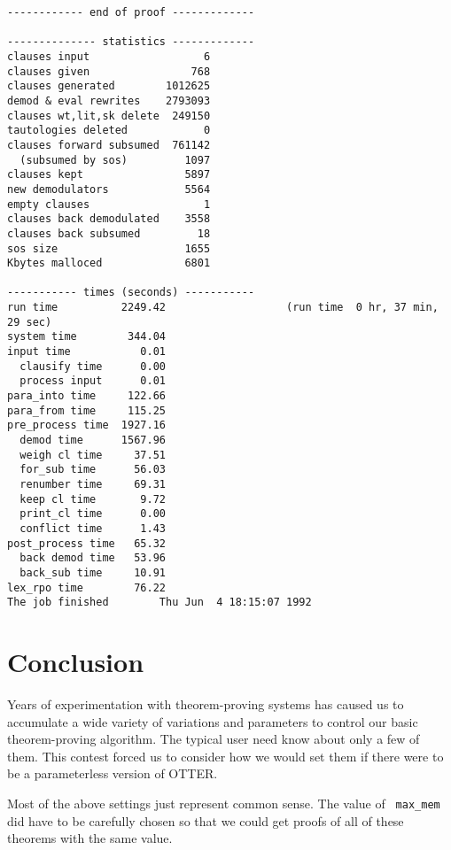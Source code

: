 {\begin{verbatim}
------------ end of proof -------------

-------------- statistics -------------
clauses input                  6
clauses given                768
clauses generated        1012625
demod & eval rewrites    2793093
clauses wt,lit,sk delete  249150
tautologies deleted            0
clauses forward subsumed  761142
  (subsumed by sos)         1097
clauses kept                5897
new demodulators            5564
empty clauses                  1
clauses back demodulated    3558
clauses back subsumed         18
sos size                    1655
Kbytes malloced             6801

----------- times (seconds) -----------
run time          2249.42                   (run time  0 hr, 37 min, 29 sec)
system time        344.04
input time           0.01
  clausify time      0.00
  process input      0.01
para_into time     122.66
para_from time     115.25
pre_process time  1927.16
  demod time      1567.96
  weigh cl time     37.51
  for_sub time      56.03
  renumber time     69.31
  keep cl time       9.72
  print_cl time      0.00
  conflict time      1.43
post_process time   65.32
  back demod time   53.96
  back_sub time     10.91
lex_rpo time        76.22
The job finished        Thu Jun  4 18:15:07 1992
\end{verbatim} }

\section{Conclusion}

Years of experimentation with theorem-proving
systems\cite{mow,aura,itp,otter2-guide,otter22} has caused us to
accumulate a wide variety of variations and parameters to control our
basic theorem-proving algorithm.  The
typical user need know about only a few of them.  This contest forced
us to consider how we would set them if there were to be a
parameterless version of OTTER.

Most of the above settings just represent common sense.  The value of {\tt
max\_mem} did have to be carefully chosen so that we could get proofs of all of
these theorems with the same value.

\nocite{mow,cd-cade,itp,aura}

